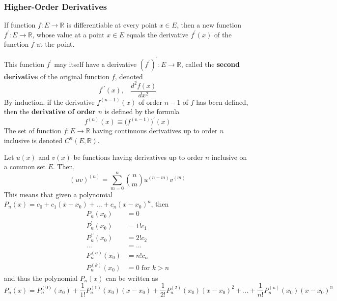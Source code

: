     \subsubsection{Higher-Order Derivatives}

    \begin{definition}
      If function $f: E \longrightarrow \mathbb{R}$ is differentiable at every point $x \in E$, then a new function $f^\prime: E \longrightarrow \mathbb{R}$, whose value at a point $x \in E$ equals the derivative $f^\prime(x)$ of the function $f$ at the point. 
    \end{definition}

    \begin{definition}
      This function $f^\prime$ may itself have a derivative $(f^\prime)^\prime : E \longrightarrow \mathbb{R}$, called the \textbf{second derivative} of the original function $f$, denoted 
      \[f^{\prime\prime} (x), \;\;\; \frac{d^2 f(x)}{dx^2}\]
      By induction, if the derivative $f^{(n-1)} (x)$ of order $n-1$ of $f$ has been defined, then the \textbf{derivative of order $n$} is defined by the formula
      \[f^{(n)} (x) \equiv \big(f^{(n-1)}\big)^\prime (x)\]
      The set of function $f: E \longrightarrow \mathbb{R}$ having continuous derivatives up to order $n$ inclusive is denoted $C^{n} (E, \mathbb{R})$. 
    \end{definition}

    \begin{lemma}
      Let $u(x)$ and $v(x)$ be functions having derivatives up to order $n$ inclusive on a common set $E$. Then, 
      \[(uv)^{(n)} = \sum_{m = 0}^n \binom{n}{m} u^{(n-m)} v^{(m)}\]
      This means that given a polynomial $P_n (x) = c_0 + c_1 (x - x_0) + \ldots + c_n (x - x_0)^n$, then 
      \begin{align*}
          P_n(x_0) & = 0 \\
          P_n^\prime (x_0) & = 1! c_1 \\
          P_n^{\prime\prime} (x_0) & = 2! c_2 \\
          \ldots & = \ldots \\
          P_n^{(n)} (x_0) & = n! c_n \\
          P_n^{(k)} (x_0) & = 0 \text{ for } k > n
      \end{align*}
      and thus the polynomial $P_n (x)$ can be written as
      \[P_n (x) = P_n^{(0)} (x_0) + \frac{1}{1!} P_n^{(1)} (x_0) (x-x_0) + \frac{1}{2!} P_n^{(2)} (x_0) (x-x_0)^2 + \ldots + \frac{1}{n!} P_n^{(n)} (x_0) (x-x_0)^n\]
    \end{lemma}

